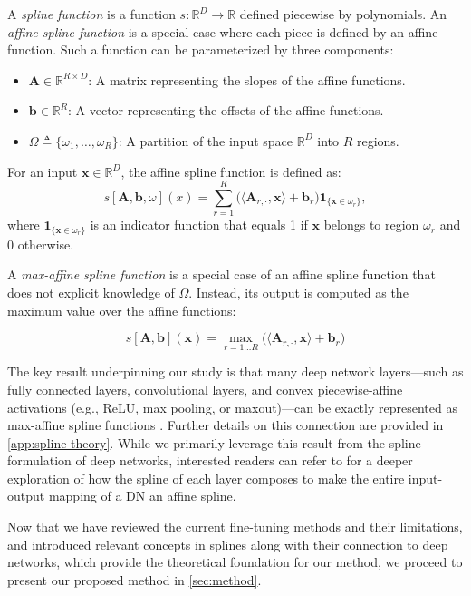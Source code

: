 A {\em spline function} is a function $s: \mathbb{R}^D \rightarrow \mathbb{R}$ defined piecewise by polynomials. An {\em affine spline function} is a special case where each piece is defined by an affine function. Such a function can be parameterized by three components: 
\begin{itemize}
    \item $\mathbf{A} \in \mathbb{R}^{R \times D}$: A matrix representing the slopes of the affine functions.
    \item $\mathbf{b} \in \mathbb{R}^R$: A vector representing the offsets of the affine functions.
    \item $\Omega \triangleq \{\omega_1, \dots, \omega_R\}$: A partition of the input space $\mathbb{R}^D$ into $R$ regions.
\end{itemize}
For an input $\mathbf{x} \in \mathbb{R}^D$, the affine spline function is defined as:
\begin{equation}
s[\mathbf{A}, \mathbf{b}, \omega](x) = \sum_{r=1}^R \big( \langle \mathbf{A}_{r,\cdot}, \mathbf{x} \rangle + \mathbf{b}_r \big) \mathbf{1}_{\{\mathbf{x}\in\omega_r\}},
\end{equation}
where $\mathbf{1}_{\{\mathbf{x}\in\omega_r\}}$ is an indicator function that equals 1 if $\mathbf{x}$ belongs to region $\omega_r$ and 0 otherwise.

A {\em max-affine spline function} is a special case of an affine spline function that does not explicit knowledge of $\Omega$. Instead, its output is computed as the maximum value over the affine functions:

\begin{equation}
s[\mathbf{A},\mathbf{b}](\mathbf{x}) = \max_{r=1 \dots R} \big( \langle \mathbf{A}_{r,\cdot}, \mathbf{x} \rangle + \mathbf{b}_r \big)\label{eq:maso}
\end{equation}

The key result underpinning our study is that many deep network layers—such as fully connected layers, convolutional layers, and convex piecewise-affine activations (e.g., ReLU, max pooling, or maxout)—can be exactly represented as max-affine spline functions \cite{balestriero2018spline}. Further details on this connection are provided in \cref{app:spline-theory}. While we primarily leverage this result from the spline formulation of deep networks, interested readers can refer to \cite{balestriero2019splinegeometry} for a deeper exploration of how the spline of each layer composes to make the entire input-output mapping of a DN an affine spline.

Now that we have reviewed the current fine-tuning methods and their limitations, and introduced relevant concepts in splines along with their connection to deep networks, which provide the theoretical foundation for our method, we proceed to present our proposed method in \cref{sec:method}.
